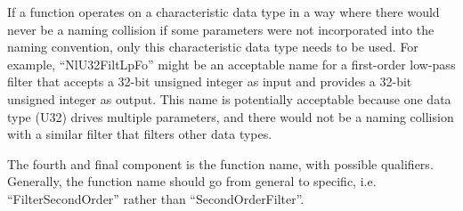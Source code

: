 If a function operates on a characteristic data type in a 
way where there would never be a naming collision if some 
parameters were not incorporated into the naming convention, 
only this characteristic data type needs to be used.  For 
example, ``NlU32FiltLpFo'' might be an acceptable name for 
a first-order low-pass filter that accepts a 32-bit unsigned 
integer as input and provides a 32-bit unsigned integer as 
output.  This name is potentially acceptable because one 
data type (U32) drives multiple parameters, and there would 
not be a naming collision with a similar filter that filters 
other data types.  

The fourth and final component is the function name, with 
possible qualifiers.  Generally, the function name should go 
from general to specific, i.e.  ``FilterSecondOrder'' rather 
than ``SecondOrderFilter''.  

